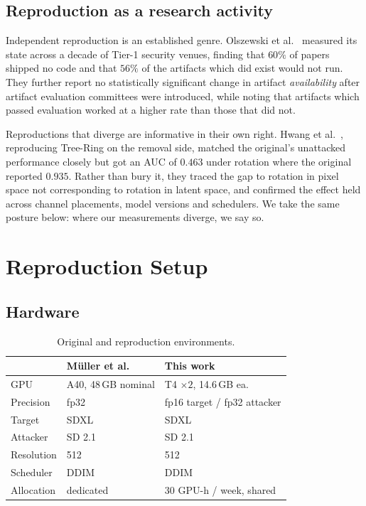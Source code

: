 \documentclass[10pt,twocolumn]{article}
\begin{document}
\subsection{Reproduction as a research activity}

Independent reproduction is an established genre. Olszewski et
al.~\cite{olszewski2023reproducibility} measured its state across a decade of Tier-1
security venues, finding that $60\%$ of papers shipped no code and that $56\%$ of the
artifacts which did exist would not run. They further report no statistically
significant change in artifact \emph{availability} after artifact evaluation
committees were introduced, while noting that artifacts which passed evaluation
worked at a higher rate than those that did not.

Reproductions that diverge are informative in their own right. Hwang et
al.~\cite{hwang2024invisible}, reproducing Tree-Ring on the removal side, matched the
original's unattacked performance closely but got an AUC of $0.463$ under rotation
where the original reported $0.935$. Rather than bury it, they traced the gap to
rotation in pixel space not corresponding to rotation in latent space, and confirmed
the effect held across channel placements, model versions and schedulers. We take the
same posture below: where our measurements diverge, we say so.
\section{Reproduction Setup}
\label{sec:setup}

\subsection{Hardware}

\begin{table}[t]
\centering\small
\caption{Original and reproduction environments.}
\label{tab:hw}
\begin{tabular}{lll}
\toprule
 & M\"uller et al. & This work \\
\midrule
GPU         & A40, 48\,GB nominal & T4 $\times 2$, 14.6\,GB ea. \\
Precision   & fp32            & fp16 target / fp32 attacker \\
Target      & SDXL            & SDXL \\
Attacker    & SD 2.1          & SD 2.1 \\
Resolution  & 512             & 512 \\
Scheduler   & DDIM            & DDIM \\
Allocation  & dedicated       & 30 GPU-h / week, shared \\
\bottomrule
\end{tabular}
\end{table}
\end{document}
